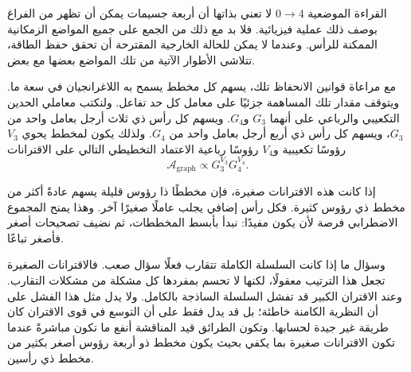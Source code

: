 القراءة الموضعية \(0\to4\) لا تعني بذاتها أن أربعة جسيمات يمكن أن تظهر من الفراغ بوصف ذلك عملية فيزيائية. فلا بد مع ذلك من الجمع على جميع المواضع الزمكانية الممكنة للرأس. وعندما لا يمكن للحالة الخارجية المقترحة أن تحقق حفظ الطاقة، تتلاشى الأطوار الآتية من تلك المواضع بعضها مع بعض.

\begin{classroomqa}
\end{classroomqa}

\begin{classroomqa}
\end{classroomqa}

مع مراعاة قوانين الانحفاظ تلك، يسهم كل مخطط يسمح به اللاغرانجيان في سعة ما. ويتوقف مقدار تلك المساهمة جزئيًا على معامل كل حد تفاعل. ولنكتب معاملي الحدين التكعيبي والرباعي على أنهما \(G_3\) و\(G_4\). ويسهم كل رأس ذي ثلاث أرجل بعامل واحد من \(G_3\)، ويسهم كل رأس ذي أربع أرجل بعامل واحد من \(G_4\). ولذلك يكون لمخطط يحوي \(V_3\) رؤوسًا تكعيبية و\(V_4\) رؤوسًا رباعية الاعتماد التخطيطي التالي على الاقترانات
\begin{equation}
\mathcal{A}_{\mathrm{graph}}
\propto G_3^{V_3}G_4^{V_4}.
\end{equation}

إذا كانت هذه الاقترانات صغيرة، فإن مخططًا ذا رؤوس قليلة يسهم عادةً أكثر من مخطط ذي رؤوس كثيرة. فكل رأس إضافي يجلب عاملًا صغيرًا آخر. وهذا يمنح المجموع الاضطرابي فرصة لأن يكون مفيدًا: نبدأ بأبسط المخططات، ثم نضيف تصحيحات أصغر فأصغر تباعًا.

وسؤال ما إذا كانت السلسلة الكاملة تتقارب فعلًا سؤال صعب. فالاقترانات الصغيرة تجعل هذا الترتيب معقولًا، لكنها لا تحسم بمفردها كل مشكلة من مشكلات التقارب. وعند الاقتران الكبير قد تفشل السلسلة الساذجة بالكامل. ولا يدل مثل هذا الفشل على أن النظرية الكامنة خاطئة؛ بل قد يدل فقط على أن التوسع في قوى الاقتران كان طريقة غير جيدة لحسابها. وتكون الطرائق قيد المناقشة أنفع ما تكون مباشرةً عندما تكون الاقترانات صغيرة بما يكفي بحيث يكون مخطط ذو أربعة رؤوس أصغر بكثير من مخطط ذي رأسين.

